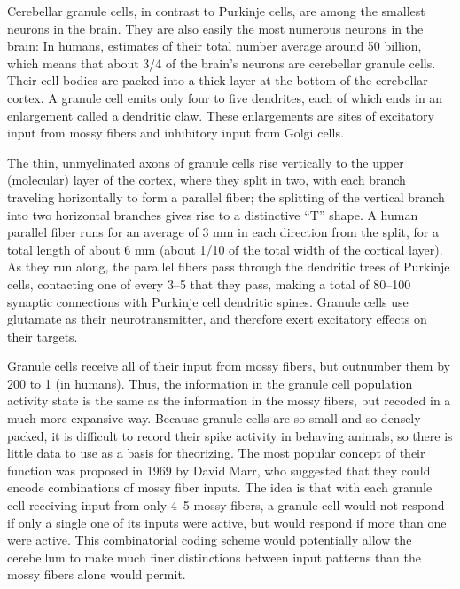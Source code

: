Cerebellar granule cells, in contrast to Purkinje cells, are among the smallest neurons in the brain. They are also easily the most numerous neurons in the brain: In humans, estimates of their total number average around 50 billion, which means that about 3/4 of the brain's neurons are cerebellar granule cells. Their cell bodies are packed into a thick layer at the bottom of the cerebellar cortex. A granule cell emits only four to five dendrites, each of which ends in an enlargement called a dendritic claw. These enlargements are sites of excitatory input from mossy fibers and inhibitory input from Golgi cells.

The thin, unmyelinated axons of granule cells rise vertically to the upper (molecular) layer of the cortex, where they split in two, with each branch traveling horizontally to form a parallel fiber; the splitting of the vertical branch into two horizontal branches gives rise to a distinctive ``T'' shape. A human parallel fiber runs for an average of 3 mm in each direction from the split, for a total length of about 6 mm (about 1/10 of the total width of the cortical layer). As they run along, the parallel fibers pass through the dendritic trees of Purkinje cells, contacting one of every 3--5 that they pass, making a total of 80--100 synaptic connections with Purkinje cell dendritic spines. Granule cells use glutamate as their neurotransmitter, and therefore exert excitatory effects on their targets.

Granule cells receive all of their input from mossy fibers, but outnumber them by 200 to 1 (in humans). Thus, the information in the granule cell population activity state is the same as the information in the mossy fibers, but recoded in a much more expansive way. Because granule cells are so small and so densely packed, it is difficult to record their spike activity in behaving animals, so there is little data to use as a basis for theorizing. The most popular concept of their function was proposed in 1969 by David Marr, who suggested that they could encode combinations of mossy fiber inputs. The idea is that with each granule cell receiving input from only 4--5 mossy fibers, a granule cell would not respond if only a single one of its inputs were active, but would respond if more than one were active. This combinatorial coding scheme would potentially allow the cerebellum to make much finer distinctions between input patterns than the mossy fibers alone would permit.

